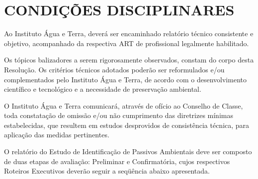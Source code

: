 \chapter{CONDIÇÕES DISCIPLINARES}

Ao Instituto Água e Terra, deverá ser encaminhado relatório
técnico consistente e objetivo, acompanhado da respectiva
ART de profissional legalmente habilitado.

Os tópicos balizadores a serem rigorosamente observados,
constam do corpo desta Resolução. Os critérios técnicos
adotados poderão ser reformulados e/ou complementados pelo
Instituto Água e Terra, de acordo com o desenvolvimento
científico e tecnológico e a necessidade de preservação
ambiental.

O Instituto Água e Terra comunicará, através de ofício ao
Conselho de Classe, toda constatação de omissão e/ou não
cumprimento das diretrizes mínimas estabelecidas, que
resultem em estudos desprovidos de consistência técnica,
para aplicação das medidas pertinentes.

O relatório do Estudo de Identificação de Passivos
Ambientais deve ser composto de duas etapas de avaliação:
Preliminar e Confirmatória, cujos respectivos Roteiros
Executivos deverão seguir a seqüência abaixo apresentada.
